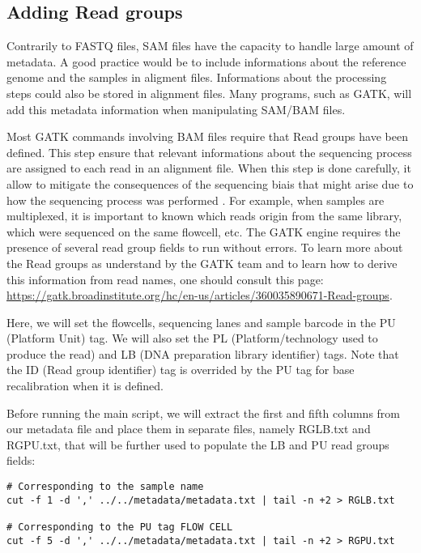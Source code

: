 \subsection{Adding Read groups}

Contrarily to FASTQ files, SAM files have the capacity to handle large amount of metadata. A good practice would be to include informations about the reference genome and the samples in aligment files. Informations about the processing steps could also be stored in alignment files. Many programs, such as GATK, will add this metadata information when manipulating SAM/BAM files.


Most GATK commands involving BAM files require that Read groups have been defined. This step ensure that relevant informations about the sequencing process are assigned to each read in an alignment file. When this step is done carefully, it allow to mitigate the consequences of the sequencing biais that might arise due to how the sequencing process was performed \cite{GATK_ReadGroups}. For example, when samples are multiplexed, it is important to known which reads origin from the same library, which were sequenced on the same flowcell, etc. The GATK engine requires the presence of several read group fields to run without errors. To learn more about the Read groups as understand by the GATK team and to learn how to derive this information from read names, one should consult this page: \href{https://gatk.broadinstitute.org/hc/en-us/articles/360035890671-Read-groups}{https://gatk.broadinstitute.org/hc/en-us/articles/360035890671-Read-groups}.

Here, we will set the flowcells, sequencing lanes and sample barcode in the PU (Platform Unit) tag. We will also set the PL (Platform/technology used to produce the read) and LB (DNA preparation library identifier) tags. Note that the ID (Read group identifier) tag is overrided by the PU tag for base recalibration when it is defined.

Before running the main script, we will extract the first and fifth columns from our metadata file and place them in separate files, namely RGLB.txt and  RGPU.txt, that will be further used to populate the LB and PU read groups fields:

\begin{verbatim}
# Corresponding to the sample name
cut -f 1 -d ',' ../../metadata/metadata.txt | tail -n +2 > RGLB.txt

# Corresponding to the PU tag FLOW CELL 
cut -f 5 -d ',' ../../metadata/metadata.txt | tail -n +2 > RGPU.txt
\end{verbatim}

